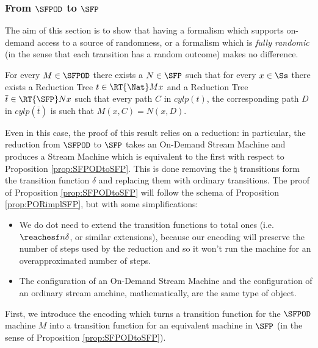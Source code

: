 \subsubsection{From $\SFPOD$ to $\SFP$}
\label{subsub:sfpodtosfp}
The aim of this section is to show that having a formalism which supports
on-demand access to a source of randomness, or a formalism which is
\emph{fully randomic} (in the sense that each transition has a random outcome)
makes no difference.

\begin{prop}
  \label{prop:SFPODtoSFP}
  For every $M \in \SFPOD$ there exists a $N \in \SFP$ such that
  for every $x \in \Ss$ there exists a Reduction Tree $t \in \RT{\Nat} M x$
  and a Reduction Tree $\overline t \in \RT{\SFP} N x$
  such that every path $C$ in $\mathit{cylp}(t)$,
  the corresponding path $D$ in $\mathit{cylp}(\overline t)$ is such that
  $M(x, C) = N(x, D)$.
\end{prop}

Even in this case, the proof of this result relies on a reduction: in particular,
the reduction from $\SFPOD$ to $\SFP$ takes an On-Demand Stream Machine and
produces a Stream Machine which is equivalent to the first with respect to
Proposition \ref{prop:SFPODtoSFP}. This is done removing the $\natural$ transitions
form the transition function $\delta$ and replacing them with ordinary transitions.
%
The proof of Proposition \ref{prop:SFPODtoSFP} will follow the schema of Proposition
\ref{prop:PORimplSFP}, but with some simplifications:

\begin{itemize}
  \item We do dot need to extend the transition functions to total ones
  (i.e. $\reachesf n \delta$, or similar extensions), because
  our encoding will preserve the number of steps used by the reduction and so it
  won't run the machine for an overapproximated number of steps.
  \item The configuration of an On-Demand Stream Machine and the configuration of an
  ordinary stream amchine, mathematically, are the same type of object.
\end{itemize}

First, we introduce the encoding which turns a transition function for the $\SFPOD$
machine $M$ into a transition function for an equivalent machine in $\SFP$
(in the sense of Proposition \ref{prop:SFPODtoSFP}).

